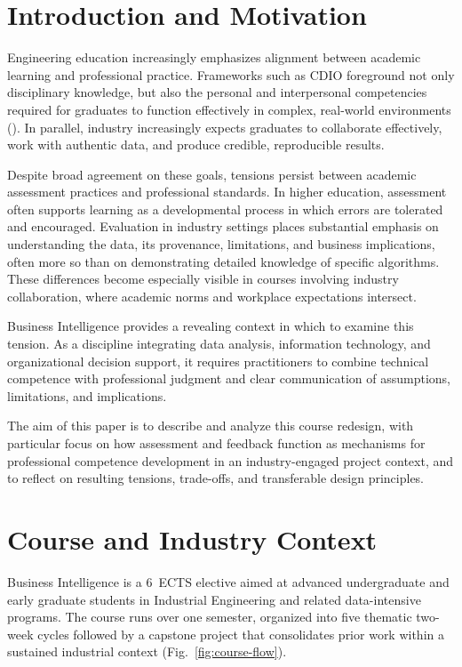 \section{Introduction and Motivation}

Engineering education increasingly emphasizes alignment between academic learning and professional practice. Frameworks such as CDIO foreground not only disciplinary knowledge, but also the personal and interpersonal competencies required for graduates to function effectively in complex, real-world environments (\cite{CDIOSyllabus3}). In parallel, industry increasingly expects graduates to collaborate effectively, work with authentic data, and produce credible, reproducible results.

Despite broad agreement on these goals, tensions persist between academic assessment practices and professional standards. In higher education, assessment often supports learning as a developmental process in which errors are tolerated and encouraged. Evaluation in industry settings places substantial emphasis on understanding the data, its provenance, limitations, and business implications, often more so than on demonstrating detailed knowledge of specific algorithms. These differences become especially visible in courses involving industry collaboration, where academic norms and workplace expectations intersect.

Business Intelligence provides a revealing context in which to examine this tension. As a discipline integrating data analysis, information technology, and organizational decision support, it requires practitioners to combine technical competence with professional judgment and clear communication of assumptions, limitations, and implications.

The aim of this paper is to describe and analyze this course redesign, with particular focus on how assessment and feedback function as mechanisms for professional competence development in an industry-engaged project context, and to reflect on resulting tensions, trade-offs, and transferable design principles.

\section{Course and Industry Context}
Business Intelligence is a 6~ECTS elective aimed at advanced undergraduate and early graduate students in Industrial Engineering and related data-intensive programs. The course runs over one semester, organized into five thematic two-week cycles followed by a capstone project that consolidates prior work within a sustained industrial context (Fig.~\ref{fig:course-flow}).

